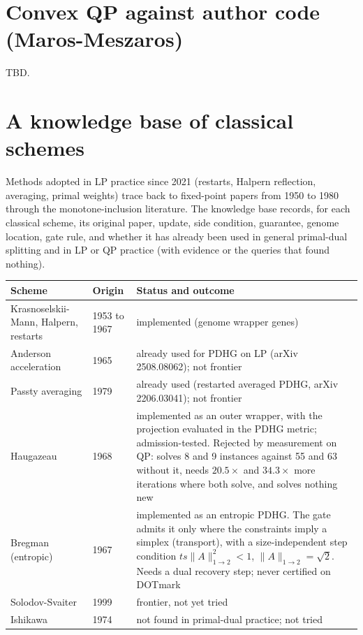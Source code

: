 \documentclass[11pt]{article}
\begin{document}
\section{Convex QP against author code (Maros-Meszaros)}
\label{app:log:qp}

TBD.

\section{A knowledge base of classical schemes}
\label{app:log:kb}

Methods adopted in LP practice
since 2021 (restarts, Halpern reflection, averaging, primal weights) trace
back to fixed-point papers from 1950 to 1980 through the monotone-inclusion
literature. The knowledge base records, for each classical scheme, its
original paper, update, side condition, guarantee, genome location, gate
rule, and whether it has already been used in general primal-dual splitting
and in LP or QP practice (with evidence or the queries that found nothing).

\begin{center}
\small
\begin{tabular}{p{2.6cm}p{2.2cm}p{7.6cm}}
\toprule
Scheme & Origin & Status and outcome \\
\midrule
Krasnoselskii-Mann, Halpern, restarts & 1953 to 1967 & implemented (genome wrapper genes) \\
Anderson acceleration & 1965 & already used for PDHG on LP (arXiv 2508.08062); not frontier \\
Passty averaging & 1979 & already used (restarted averaged PDHG, arXiv 2206.03041); not frontier \\
Haugazeau & 1968 & implemented as an outer wrapper, with the projection evaluated in the PDHG metric; admission-tested. Rejected by measurement on QP: solves 8 and 9 instances against 55 and 63 without it, needs $20.5\times$ and $34.3\times$ more iterations where both solve, and solves nothing new \\
Bregman (entropic) & 1967 & implemented as an entropic PDHG. The gate admits it only where the constraints imply a simplex (transport), with a size-independent step condition $t s \|A\|_{1\to2}^2<1$, $\|A\|_{1\to2}=\sqrt2$. Needs a dual recovery step; never certified on DOTmark \\
Solodov-Svaiter & 1999 & frontier, not yet tried \\
Ishikawa & 1974 & not found in primal-dual practice; not tried \\
\bottomrule
\end{tabular}
\end{center}
\end{document}
